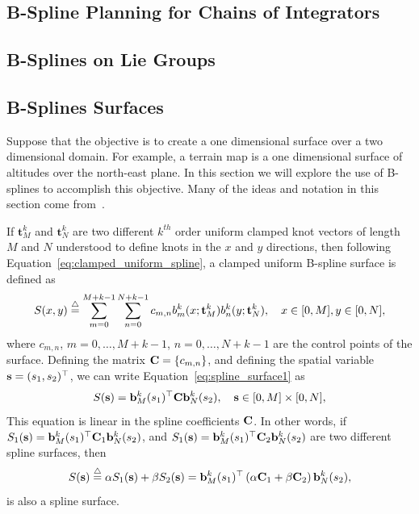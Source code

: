 \subsection{B-Spline Planning for Chains of Integrators}

\subsection{B-Splines on Lie Groups}

\subsection{B-Splines Surfaces}

Suppose that the objective is to create a one dimensional surface over a two dimensional domain.  For example, a terrain map is a one dimensional surface of altitudes over the north-east plane.  In this section we will explore the use of B-splines to accomplish this objective. Many of the ideas and notation in this section come from~\cite{RodriguesTsiogkasAguiar20}.

If $\mathbf{t}_M^k$ and $\mathbf{t}_N^k$ are two different $k^{th}$ order uniform clamped knot vectors of length $M$ and $N$ understood to define knots in the $x$ and $y$ directions, then following Equation~\eqref{eq:clamped_uniform_spline}, a clamped uniform B-spline surface is defined as 
\begin{equation}\label{eq:spline_surface1}
S(x, y) \defeq \sum_{m=0}^{M+k-1} \sum_{n=0}^{N+k-1} c_{m,n} b^k_m(x; \mathbf{t}_M^k) b^k_n(y; \mathbf{t}_N^k), \quad x\in[0,M], y\in[0, N],
\end{equation}
where $c_{m, n}$, $m=0, \dots, M+k-1$, $n=0, \dots, N+k-1$ are the control points of the surface.  Defining the matrix $\mathbf{C}=\{c_{m,n}\}$, and defining the spatial variable $\mathbf{s} = (s_1, s_2)^\top$, we can write Equation~\eqref{eq:spline_surface1} as
\begin{equation}\label{eq:spline_surface2}
S(\sbf) = \bbf^k_M(s_1)^\top \Cbf \bbf^k_N(s_2), \quad \sbf\in[0, M]\times[0, N],
\end{equation}
This equation is linear in the spline coefficients $\mathbf{C}$.  In other words, if $S_1(\mathbf{s})=\mathbf{b}^k_M(s_1)^\top \mathbf{C}_1 \mathbf{b}^k_N(s_2)$, and $S_1(\mathbf{s})=\mathbf{b}^k_M(s_1)^\top \mathbf{C}_2 \mathbf{b}^k_N(s_2)$ are two different spline surfaces, then 
\[
S(\mathbf{s})\stackrel{\triangle}{=} \alpha S_1(\mathbf{s}) + \beta S_2(\mathbf{s}) = \mathbf{b}^k_M(s_1)^\top \left(\alpha\mathbf{C}_1 + \beta\mathbf{C}_2\right) \mathbf{b}^k_N(s_2),
\]
is also a spline surface.

